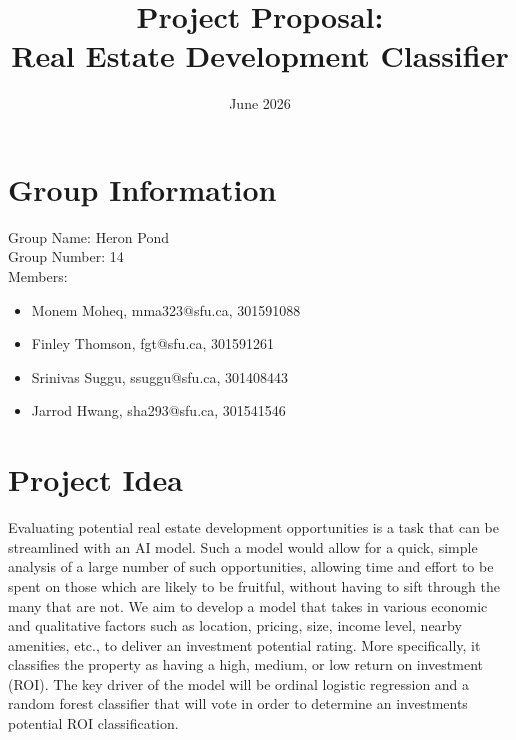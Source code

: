 \documentclass{article}
\title{\bf{Project Proposal:\\Real Estate Development Classifier}}
\date{June 2026}
\begin{document}
\maketitle

\section*{Group Information}
Group Name: Heron Pond\\ %
Group Number: 14
\\Members:
\begin{itemize}
    \item Monem Moheq, mma323@sfu.ca, 301591088
    \item Finley Thomson, fgt@sfu.ca, 301591261
    \item Srinivas Suggu, ssuggu@sfu.ca, 301408443
    \item Jarrod Hwang, sha293@sfu.ca, 301541546
\end{itemize}

\section*{Project Idea}
Evaluating potential real estate development opportunities is a task that can be streamlined with an AI model. Such a model would allow for a quick, simple analysis of a large number of such opportunities, allowing time and effort to be spent on those which are likely to be fruitful, without having to sift through the many that are not. We aim to develop a model that takes in various economic and qualitative factors such as location, pricing, size, income level, nearby amenities, etc., to deliver an investment potential rating. More specifically, it classifies the property as having a high, medium, or low return on investment (ROI). The key driver of the model will be ordinal logistic regression and a random forest classifier that will vote in order to determine an investments potential ROI classification. 
\end{document}
